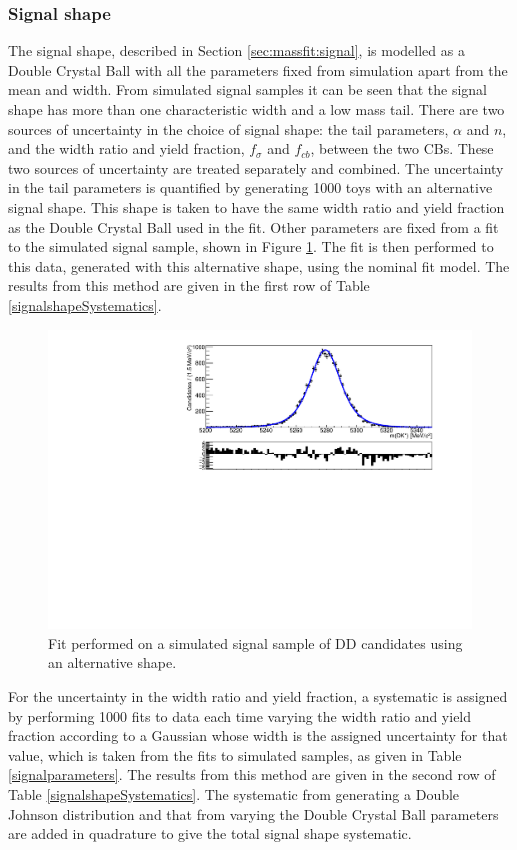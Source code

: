 \subsubsection{Signal shape}
\label{sec:systematics:signal}

The signal shape, described in Section \ref{sec:massfit:signal}, is modelled as a Double Crystal Ball with all the parameters fixed from simulation apart from the mean and width. From simulated signal samples it can be seen that the signal shape has more than one characteristic width and a low mass tail. There are two sources of uncertainty in the choice of signal shape: the tail parameters, $\alpha$ and $n$, and the width ratio and yield fraction, $f_{\sigma}$ and $f_{cb}$, between the two CBs. These two sources of uncertainty are treated separately and combined. The uncertainty in the tail parameters is quantified by generating 1000 toys with an alternative signal shape. This shape is taken to have the same width ratio and yield fraction as the Double Crystal Ball used in the \CP fit. Other parameters are fixed from a fit to the simulated signal sample, shown in Figure \ref{signalshapesys}. The \CP fit is then performed to this data, generated with this alternative shape, using the nominal fit model.  The results from this method are given in the first row of Table \ref{signalshapeSystematics}.

\begin{figure}[h]
\centering
\includegraphics[width=0.5\linewidth]{figures/fitComponents/signalShape_DD_KPi_Johnson.pdf}
\caption{Fit performed on a simulated signal sample of DD candidates using an alternative shape.}
\label{signalshapesys}
\end{figure}

For the uncertainty in the width ratio and yield fraction, a systematic is assigned by performing 1000 fits to data each time varying the width ratio and yield fraction according to a Gaussian whose width is the assigned uncertainty for that value, which is taken from the fits to simulated samples, as given in Table \ref{signalparameters}. The results from this method are given in the second row of Table \ref{signalshapeSystematics}. The systematic from generating a Double Johnson distribution and that from varying the Double Crystal Ball parameters are added in quadrature to give the total signal shape systematic.

